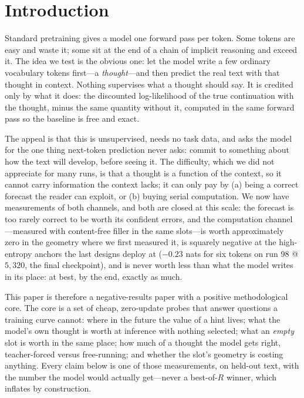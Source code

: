 \documentclass{article} %
\begin{document}
\begin{abstract}
at one sixty-fourth of the stated batch; we flag which conclusions that can change.
\end{abstract}

\section{Introduction}

Standard pretraining gives a model one forward pass per token. Some tokens are easy and waste it; some sit at the end of a chain of implicit reasoning and exceed it. The idea we test is the obvious one: let the model write a few ordinary vocabulary tokens first---a \emph{thought}---and then predict the real text with that thought in context. Nothing supervises what a thought should say. It is credited only by what it does: the discounted log-likelihood of the true continuation with the thought, minus the same quantity without it, computed in the same forward pass so the baseline is free and exact.

The appeal is that this is unsupervised, needs no task data, and asks the model for the one thing next-token prediction never asks: commit to something about how the text will develop, before seeing it. The difficulty, which we did not appreciate for many runs, is that a thought is a function of the context, so it cannot carry information the context lacks; it can only pay by (a) being a correct forecast the reader can exploit, or (b) buying serial computation. We now have measurements of both channels, and both are closed at this scale: the forecast is too rarely correct to be worth its confident errors, and the computation channel---measured with content-free filler in the same slots---is worth approximately zero in the geometry where we first measured it, is squarely negative at the high-entropy anchors the last designs deploy at ($-0.23$ nats for six tokens on run 98 @ $5{,}320$, the final checkpoint), and is never worth less than what the model writes in its place: at best, by the end, exactly as much.

This paper is therefore a negative-results paper with a positive methodological core. The core is a set of cheap, zero-update probes that answer questions a training curve cannot: where in the future the value of a hint lives; what the model's own thought is worth at inference with nothing selected; what an \emph{empty} slot is worth in the same place; how much of a thought the model gets right, teacher-forced versus free-running; and whether the slot's geometry is costing anything. Every claim below is one of those measurements, on held-out text, with the number the model would actually get---never a best-of-$R$ winner, which inflates by construction.
\end{document}
